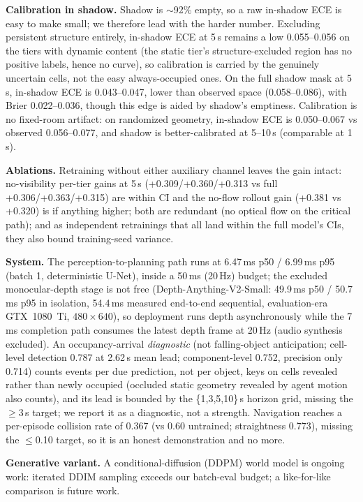 \documentclass{article}
\begin{document}
\textbf{Calibration in shadow.} Shadow is ${\sim}$92\% empty, so a raw in-shadow ECE is easy to
make small; we therefore lead with the harder number. Excluding persistent structure entirely,
in-shadow ECE at 5\,s remains a low 0.055--0.056 on the tiers with dynamic content (the static
tier's structure-excluded region has no positive labels, hence no curve), so calibration is
carried by the genuinely uncertain cells, not the easy always-occupied ones. On the full shadow
mask at 5\,s, in-shadow ECE is 0.043--0.047, lower than observed space (0.058--0.086), with Brier
0.022--0.036, though this edge is aided by shadow's emptiness. Calibration is no fixed-room
artifact: on randomized geometry, in-shadow ECE is 0.050--0.067 vs observed 0.056--0.077, and
shadow is better-calibrated at 5--10\,s (comparable at 1\,s).

\textbf{Ablations.} Retraining without either auxiliary channel leaves the gain intact:
no-visibility per-tier gains at 5\,s (+0.309/+0.360/+0.313 vs full +0.306/+0.363/+0.315) are
within CI and the no-flow rollout gain (+0.381 vs +0.320) is if anything higher; both are
redundant (no optical flow on the critical path); and as independent retrainings that all land
within the full model's CIs, they also bound training-seed variance.

\textbf{System.} The perception-to-planning path runs at 6.47\,ms p50 / 6.99\,ms p95 (batch 1,
deterministic U-Net), inside a 50\,ms (20\,Hz) budget; the excluded monocular-depth stage is
not free (Depth-Anything-V2-Small: 49.9\,ms p50 / 50.7\,ms p95 in isolation, 54.4\,ms measured
end-to-end sequential, evaluation-era GTX~1080~Ti, $480{\times}640$), so deployment runs depth
asynchronously while the 7\,ms completion path consumes the latest depth frame at 20\,Hz
(audio synthesis excluded). An occupancy-arrival \emph{diagnostic} (not falling-object anticipation; cell-level detection 0.787 at 2.62\,s mean lead;
component-level 0.752, precision only 0.714) counts events per due prediction, not per object,
keys on cells revealed rather than newly occupied (occluded static geometry revealed by agent
motion also counts), and its lead is bounded by the \{1,3,5,10\}\,s horizon grid, missing the
$\ge$3\,s target; we report it as a diagnostic, not a strength. Navigation reaches a per-episode
collision rate of 0.367 (vs 0.60 untrained; straightness 0.773), missing the $\le$0.10 target, so
it is an honest demonstration and no more.

\textbf{Generative variant.} A conditional-diffusion (DDPM) world model is ongoing work:
iterated DDIM sampling exceeds our batch-eval budget; a like-for-like comparison is future work.
\end{document}
